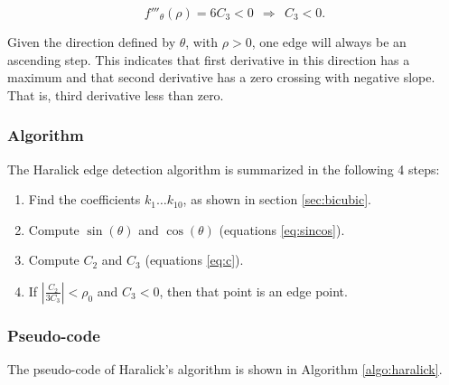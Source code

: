 \documentclass{ipol}
\numberwithin{equation}{section}
\numberwithin{table}{section}
\numberwithin{figure}{section}
\begin{document}
\begin{equation}
	f'''_{\theta}(\rho) = 6C_3 < 0 \ \ \Rightarrow \ \ C_3 < 0.
\end{equation}

Given the direction defined by $\theta$, with $\rho>0$, one edge will always be an ascending step. This 
indicates that first derivative in this direction has a maximum and that second derivative has a zero 
crossing with negative slope. That is, third derivative less than zero.



\subsubsection{Algorithm}

The Haralick edge detection algorithm is summarized in the following 4 steps:

\begin{enumerate}
	\item Find the coefficients $k_1 \hdots k_{10}$, as shown in section \ref{sec:bicubic}.
	\item Compute $\sin(\theta)$ and $\cos(\theta)$ (equations \ref{eq:sincos}).
	\item Compute $C_2$ and $C_3$ (equations \ref{eq:c}).
	\item If $\left| \frac{C_2}{3C_3} \right| < \rho_0$ and $C_3 < 0$, then that point is an edge point.
\end{enumerate}


\subsubsection{Pseudo-code}

The pseudo-code of Haralick's algorithm is shown in Algorithm \ref{algo:haralick}.
\end{document}
